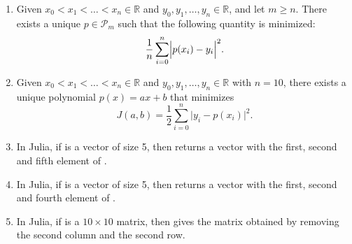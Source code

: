\documentclass[a4paper]{article}
\begin{document}
\begin{enumerate}
    \item
        Given $x_0 < x_1 < \dotsc < x_n \in \mathbb R$
        and $y_0, y_1, \dotsc , y_n \in \mathbb R$,
        and let $m \geq n$. 
        There exists a unique $p \in \mathcal P_m$ such that the following quantity is minimized:
        \[
            \frac{1}{n} \sum_{i=0}^{n} \Bigl\lvert p(x_i) - y_i \Bigr\rvert^2.
        \]

    \item
        Given $x_0 < x_1 < \dotsc < x_n \in \mathbb R$
        and $y_0, y_1, \dotsc , y_n \in \mathbb R$ with $n = 10$,
        there exists a unique polynomial $p(x) = ax + b$ that minimizes
        \[
            J(a, b) = \frac{1}{2} \sum_{i=0}^n \bigl\lvert y_i - p(x_i) \bigr\rvert^2.
        \]

    \item
        In Julia, if  is a vector of size 5,
        then  returns a vector with the first, second and fifth element of .

    \item
        In Julia, if  is a vector of size 5,
        then  returns a vector with the first, second and fourth element of .

    \item
        In Julia, if  is a $10\times10$ matrix,
        then  gives the matrix obtained by removing the second column and the second row.
\end{enumerate}
\end{document}
